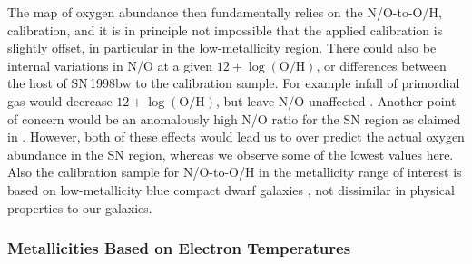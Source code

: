 \documentclass[traditabstract]{aa}
\newcommand{\oh}{$12+\log(\mathrm{O/H})$}
\begin{document}
The map of oxygen abundance then fundamentally relies on the N/O-to-O/H, calibration, and it is in principle not impossible that the applied calibration is slightly offset, in particular in the low-metallicity region. There could also be internal variations in N/O at a given \oh, or differences between the host of SN\,1998bw to the calibration sample. For example infall of primordial gas would decrease \oh, but leave N/O unaffected \citep{2016ApJ...823L..24K}. Another point of concern would be an anomalously high N/O ratio for the SN region as claimed in \citet{2006A&A...454..103H}. However, both of these effects would lead us to over predict the actual oxygen abundance in the SN region, whereas we observe some of the lowest values here. Also the calibration sample for N/O-to-O/H in the metallicity range of interest is based on low-metallicity blue compact dwarf galaxies \citep{1999ApJ...511..639I}, not dissimilar in physical properties to our galaxies. 


\subsubsection{Metallicities Based on Electron Temperatures}
\end{document}
